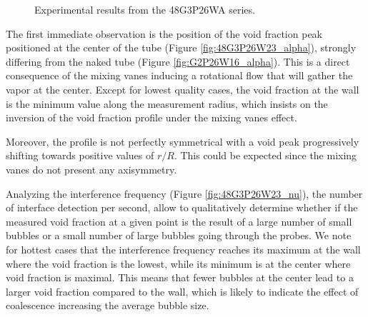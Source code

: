 \begin{figure}[!h]
\centering
{}

\caption{Experimental results from the 48G3P26WA series.}
\label{fig:exp_48G3P26W23}
\end{figure}

\npar
The first immediate observation is the position of the void fraction peak positioned at the center of the tube (Figure \ref{fig:48G3P26W23_alpha}), strongly differing from the naked tube (Figure \ref{fig:G2P26W16_alpha}). This is a direct consequence of the mixing vanes inducing a rotational flow that will gather the vapor at the center. Except for lowest quality cases, the void fraction at the wall is the minimum value along the measurement radius, which insists on the inversion of the void fraction profile under the mixing vanes effect. 

Moreover, the profile is not perfectly symmetrical with a void peak progressively shifting towards positive values of $r/R$. This could be expected since the mixing vanes do not present any axisymmetry.

\npar

Analyzing the interference frequency (Figure \ref{fig:48G3P26W23_nu}), \ie the number of interface detection per second, allow to qualitatively determine whether if the measured void fraction at a given point is the result of a large number of small bubbles or a small number of large bubbles going through the probes. We note for hottest cases that the interference frequency reaches its maximum at the wall where the void fraction is the lowest, while its minimum is at the center where void fraction is maximal. This means that fewer bubbles at the center lead to a larger void fraction compared to the wall, which is likely to indicate the effect of coalescence increasing the average bubble size. 

